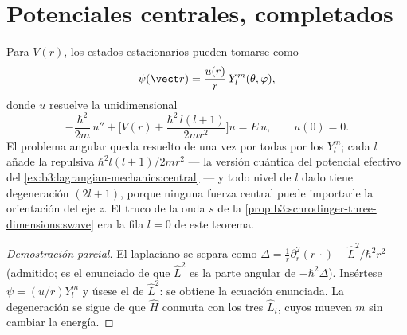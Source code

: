 \section{Potenciales centrales, completados}

\begin{theorem}\label{thm:b3:quantum-angular-momentum:radial}
Para $V(r)$, los estados estacionarios pueden tomarse como
\[
\psi(\vect r) = \frac{u(r)}{r}\,Y_l^m(\theta, \varphi) ,
\]
donde $u$ resuelve la  unidimensional
\[
-\frac{\hbar^2}{2m}\,u'' + \Big[V(r) +
\frac{\hbar^2\,l(l+1)}{2mr^2}\Big]u = E\,u , \qquad u(0) = 0 .
\]
El problema angular queda resuelto de una vez por todas por los $Y_l^m$;
cada $l$ añade la \emph{} repulsiva
$\hbar^2l(l+1)/2mr^2$ --- la versión cuántica del potencial efectivo del
\cref{ex:b3:lagrangian-mechanics:central} --- y todo nivel de $l$ dado tiene
degeneración $(2l+1)$, porque ninguna fuerza central puede importarle la
orientación del eje $z$. El truco de la onda $s$ de la
\cref{prop:b3:schrodinger-three-dimensions:swave} era la fila $l = 0$ de
este teorema.
\end{theorem}

\begin{proof}[Demostración parcial]
El laplaciano se separa como $\Delta = \tfrac1r\partial_r^2(r\,\cdot) -
\hat L^2/\hbar^2r^2$ (admitido; es el enunciado de que $\hat L^2$
es la parte angular de $-\hbar^2\Delta$). Insértese $\psi = (u/r)Y_l^m$
y úsese el  de $\hat L^2$: se obtiene la ecuación enunciada. La
degeneración se sigue de que $\hat H$ conmuta con los tres $\hat
L_i$, cuyos  mueven $m$ sin cambiar la energía.
\end{proof}

